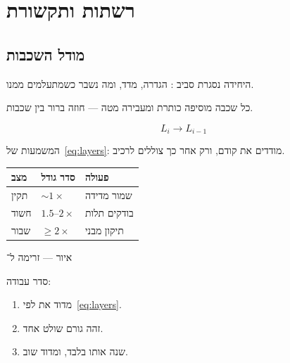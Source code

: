\part{רשתות ותקשורת}

\chapter{מודל השכבות}
\label{ch:layers}

היחידה נסגרת סביב : הגדרה, מדד, ומה נשבר כשמתעלמים ממנו.

\begin{defbox}[frametitle={הגדרה — מודל השכבות}]
כל שכבה מוסיפה כותרת ומעבירה מטה — חוזה ברור בין שכבות.
\end{defbox}

\begin{equation}
\label{eq:layers}
L_i \to L_{i-1}
\end{equation}

המשמעות של~\eqref{eq:layers}: מודדים את  קודם, ורק אחר כך צוללים לרכיב.

\begin{tablebox}\centering\small
\begin{tabular}{@{}lll@{}}
\toprule
\textbf{מצב} & \textbf{סדר גודל} & \textbf{פעולה}\\
\midrule
תקין & $\sim 1\times$ & שמור מדידה\\
חשוד & $1.5$–$2\times$ & בודקים תלות\\
שבור & $\ge 2\times$ & תיקון מבני\\
\bottomrule
\end{tabular}
\end{tablebox}

\begin{tikzpic}
\end{tikzpic}
\begin{center}\small איור — זרימה ל־\end{center}

סדר עבודה:
\begin{enumerate}
\item[(\textbf{א})] מדוד את  לפי~\eqref{eq:layers}.
\item[(\textbf{ב})] זהה גורם שולט אחד.
\item[(\textbf{ג})] שנה אותו בלבד, ומדוד שוב.
\end{enumerate}

